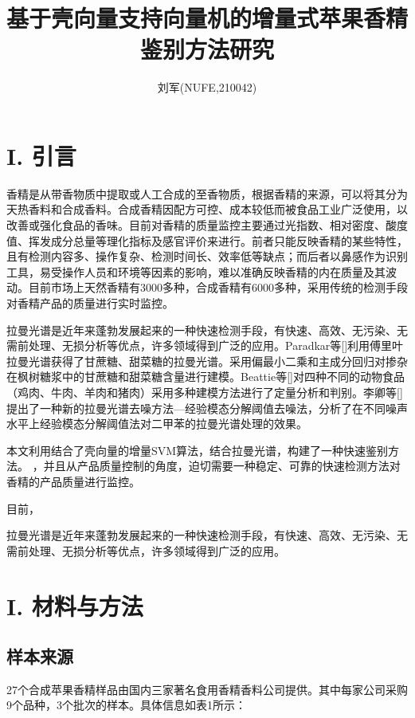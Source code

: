 \documentclass[a4paper]{article}
\author{刘军(NUFE,210042)}
\date{}
\title{基于壳向量支持向量机的增量式苹果香精鉴别方法研究 }
\begin{document}
\maketitle
\section{I.	引言}
香精是从带香物质中提取或人工合成的至香物质，根据香精的来源，可以将其分为天热香料和合成香料。合成香精因配方可控、成本较低而被食品工业广泛使用，以改善或强化食品的香味。目前对香精的质量监控主要通过光指数、相对密度、酸度值、挥发成分总量等理化指标及感官评价来进行。前者只能反映香精的某些特性，且有检测内容多、操作复杂、检测时间长、效率低等缺点；而后者以鼻感作为识别工具，易受操作人员和环境等因素的影响，难以准确反映香精的内在质量及其波动。目前市场上天然香精有3000多种，合成香精有6000多种，采用传统的检测手段对香精产品的质量进行实时监控。

拉曼光谱是近年来蓬勃发展起来的一种快速检测手段，有快速、高效、无污染、无需前处理、无损分析等优点，许多领域得到广泛的应用。Paradkar等[]利用傅里叶拉曼光谱获得了甘蔗糖、甜菜糖的拉曼光谱。采用偏最小二乘和主成分回归对掺杂在枫树糖浆中的甘蔗糖和甜菜糖含量进行建模。Beattie等[]对四种不同的动物食品（鸡肉、牛肉、羊肉和猪肉）采用多种建模方法进行了定量分析和判别。李卿等[]提出了一种新的拉曼光谱去噪方法—经验模态分解阈值去噪法，分析了在不同噪声水平上经验模态分解阈值法对二甲苯的拉曼光谱处理的效果。

本文利用结合了壳向量的增量SVM算法，结合拉曼光谱，构建了一种快速鉴别方法。
，并且从产品质量控制的角度，迫切需要一种稳定、可靠的快速检测方法对香精的产品质量进行监控。


目前，

拉曼光谱是近年来蓬勃发展起来的一种快速检测手段，有快速、高效、无污染、无需前处理、无损分析等优点，许多领域得到广泛的应用。
\section{I.	材料与方法}
\subsection{样本来源}
27个合成苹果香精样品由国内三家著名食用香精香料公司提供。其中每家公司采购9个品种，3个批次的样本。具体信息如表1所示：
\end{document}
